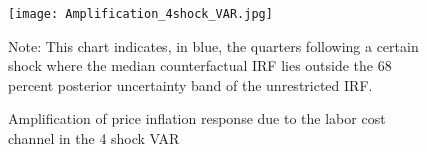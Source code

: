 \documentclass[11pt]{article}
\begin{document}

\begin{figure}
\begin{center}
\caption{Amplification of price inflation response due to the labor cost channel in the 4 shock VAR}\label{fig:4ShockVAR_Counterfactual}
\texttt{[image: Amplification\_4shock\_VAR.jpg]}
\begin{minipage}{\textwidth} {\footnotesize
 Note: This chart indicates, in blue, the quarters following a certain shock where the median counterfactual IRF lies outside the 68 percent posterior uncertainty band of the unrestricted IRF. \par}
 \end{minipage}
\end{center}
\end{figure}




\end{document}
